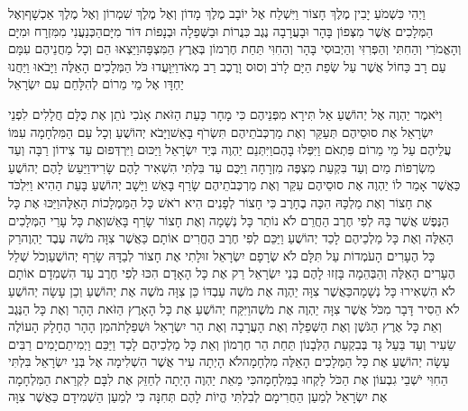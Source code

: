 \documentclass[../main/main.tex]{subfiles}
\begin{document}
\begin{multicols*}{\ncols}
וַיְהִי כִּשְׁמֹעַ יָבִין מֶלֶךְ חָצוֹר וַיִּשְׁלַח אֶל יוֹבָב מֶלֶךְ מָדוֹן וְאֶל מֶלֶךְ שִׁמְרוֹן וְאֶל מֶלֶךְ אַכְשָׁף\PreVerseSpace{}וְאֶל הַמְּלָכִים אֲשֶׁר מִצְּפוֹן בָּהָר וּבָעֲרָבָה נֶגֶב כִּנֲרוֹת וּבַשְּׁפֵלָה וּבְנָפוֹת דּוֹר מִיָּם\PreVerseSpace{}הַכְּנַעֲנִי מִמִּזְרָח וּמִיָּם וְהָאֱמֹרִי וְהַחִתִּי וְהַפְּרִזִּי וְהַיְבוּסִי בָּהָר וְהַחִוִּי תַּחַת חֶרְמוֹן בְּאֶרֶץ הַמִּצְפָּה\PreVerseSpace{}וַיֵּצְאוּ הֵם וְכָל מַחֲנֵיהֶם עִמָּם עַם רָב כַּחוֹל אֲשֶׁר עַל שְׂפַת הַיָּם לָרֹב וְסוּס וָרֶכֶב רַב מְאֹד\PreVerseSpace{}וַיִּוָּעֲדוּ כֹּל הַמְּלָכִים הָאֵלֶּה וַיָּבֹאוּ וַיַּחֲנוּ יַחְדָּו אֶל מֵי מֵרוֹם לְהִלָּחֵם עִם יִשְׂרָאֵל\OpenSection{}\par
{}וַיֹּאמֶר יַהְוֶה אֶל יְהוֹשֻׁעַ אַל תִּירָא מִפְּנֵיהֶם כִּי מָחָר כָּעֵת הַזֹּאת אָנֹכִי נֹתֵן אֶת כֻּלָּם חֲלָלִים לִפְנֵי יִשְׂרָאֵל אֶת סוּסֵיהֶם תְּעַקֵּר וְאֶת מַרְכְּבֹתֵיהֶם תִּשְׂרֹף בָּאֵשׁ\PreVerseSpace{}וַיָּבֹא יְהוֹשֻׁעַ וְכָל עַם הַמִּלְחָמָה עִמּוֹ עֲלֵיהֶם עַל מֵי מֵרוֹם פִּתְאֹם וַיִּפְּלוּ בָּהֶם\PreVerseSpace{}וַיִּתְּנֵם יַהְוֶה בְּיַד יִשְׂרָאֵל וַיַּכּוּם וַיִּרְדְּפוּם עַד צִידוֹן רַבָּה וְעַד מִשְׂרְפוֹת מַיִם וְעַד בִּקְעַת מִצְפֶּה מִזְרָחָה וַיַּכֻּם עַד בִּלְתִּי הִשְׁאִיר לָהֶם שָׂרִיד\PreVerseSpace{}וַיַּעַשׂ לָהֶם יְהוֹשֻׁעַ כַּאֲשֶׁר אָמַר לוֹ יַהְוֶה אֶת סוּסֵיהֶם עִקֵּר וְאֶת מַרְכְּבֹתֵיהֶם שָׂרַף בָּאֵשׁ \ClosedSection{}וַיָּשָׁב יְהוֹשֻׁעַ בָּעֵת הַהִיא וַיִּלְכֹּד אֶת חָצוֹר וְאֶת מַלְכָּהּ הִכָּה בֶחָרֶב כִּי חָצוֹר לְפָנִים הִיא רֹאשׁ כָּל הַמַּמְלָכוֹת הָאֵלֶּה\PreVerseSpace{}וַיַּכּוּ אֶת כָּל הַנֶּפֶשׁ אֲשֶׁר בָּהּ לְפִי חֶרֶב הַחֲרֵם לֹא נוֹתַר כָּל נְשָׁמָה וְאֶת חָצוֹר שָׂרַף בָּאֵשׁ\PreVerseSpace{}וְאֶת כָּל עָרֵי הַמְּלָכִים הָאֵלֶּה וְאֶת כָּל מַלְכֵיהֶם לָכַד יְהוֹשֻׁעַ וַיַּכֵּם לְפִי חֶרֶב הֶחֱרִים אוֹתָם כַּאֲשֶׁר צִוָּה מֹשֶׁה עֶבֶד יַהְוֶה\PreVerseSpace{}רַק כָּל הֶעָרִים הָעֹמְדוֹת עַל תִּלָּם לֹא שְׂרָפָם יִשְׂרָאֵל זוּלָתִי אֶת חָצוֹר לְבַדָּהּ שָׂרַף יְהוֹשֻׁעַ\PreVerseSpace{}וְכֹל שְׁלַל הֶעָרִים הָאֵלֶּה וְהַבְּהֵמָה בָּזְזוּ לָהֶם בְּנֵי יִשְׂרָאֵל רַק אֶת כָּל הָאָדָם הִכּוּ לְפִי חֶרֶב עַד הִשְׁמִדָם אוֹתָם לֹא הִשְׁאִירוּ כָּל נְשָׁמָה\PreVerseSpace{}כַּאֲשֶׁר צִוָּה יַהְוֶה אֶת מֹשֶׁה עַבְדּוֹ כֵּן צִוָּה מֹשֶׁה אֶת יְהוֹשֻׁעַ וְכֵן עָשָׂה יְהוֹשֻׁעַ לֹא הֵסִיר דָּבָר מִכֹּל אֲשֶׁר צִוָּה יַהְוֶה אֶת מֹשֶׁה\PreVerseSpace{}וַיִּקַּח יְהוֹשֻׁעַ אֶת כָּל הָאָרֶץ הַזֹּאת הָהָר וְאֶת כָּל הַנֶּגֶב וְאֵת כָּל אֶרֶץ הַגֹּשֶׁן וְאֶת הַשְּׁפֵלָה וְאֶת הָעֲרָבָה וְאֶת הַר יִשְׂרָאֵל וּשְׁפֵלָתֹה\PreVerseSpace{}מִן הָהָר הֶחָלָק הָעוֹלֶה שֵׂעִיר וְעַד בַּעַל גָּד בְּבִקְעַת הַלְּבָנוֹן תַּחַת הַר חֶרְמוֹן וְאֵת כָּל מַלְכֵיהֶם לָכַד וַיַּכֵּם וַיְמִיתֵם\PreVerseSpace{}יָמִים רַבִּים עָשָׂה יְהוֹשֻׁעַ אֶת כָּל הַמְּלָכִים הָאֵלֶּה מִלְחָמָה\PreVerseSpace{}לֹא הָיְתָה עִיר אֲשֶׁר הִשְׁלִימָה אֶל בְּנֵי יִשְׂרָאֵל בִּלְתִּי הַחִוִּי יֹשְׁבֵי גִבְעוֹן אֶת הַכֹּל לָקְחוּ בַמִּלְחָמָה\PreVerseSpace{}כִּי מֵאֵת יַהְוֶה הָיְתָה לְחַזֵּק אֶת לִבָּם לִקְרַאת הַמִּלְחָמָה אֶת יִשְׂרָאֵל לְמַעַן הַחֲרִימָם לְבִלְתִּי הֱיוֹת לָהֶם תְּחִנָּה כִּי לְמַעַן הַשְׁמִידָם כַּאֲשֶׁר צִוָּה 
\end{multicols*}
\end{document}
